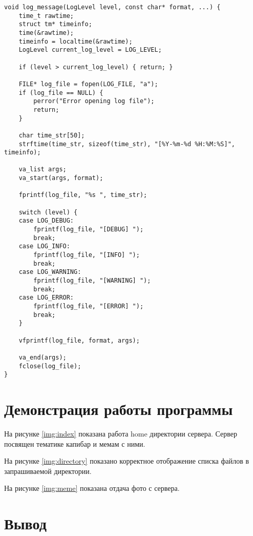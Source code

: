\documentclass{bmstu}
\begin{document}
\begin{lstlisting}[caption={Логгер}, label=lst:logger]
void log_message(LogLevel level, const char* format, ...) {
    time_t rawtime;
    struct tm* timeinfo;
    time(&rawtime);
    timeinfo = localtime(&rawtime);
    LogLevel current_log_level = LOG_LEVEL;

    if (level > current_log_level) { return; }

    FILE* log_file = fopen(LOG_FILE, "a");
    if (log_file == NULL) {
        perror("Error opening log file");
        return;
    }

    char time_str[50];
    strftime(time_str, sizeof(time_str), "[%Y-%m-%d %H:%M:%S]", timeinfo);

    va_list args;
    va_start(args, format);

    fprintf(log_file, "%s ", time_str);

    switch (level) {
    case LOG_DEBUG:
        fprintf(log_file, "[DEBUG] ");
        break;
    case LOG_INFO:
        fprintf(log_file, "[INFO] ");
        break;
    case LOG_WARNING:
        fprintf(log_file, "[WARNING] ");
        break;
    case LOG_ERROR:
        fprintf(log_file, "[ERROR] ");
        break;
    }

    vfprintf(log_file, format, args);

    va_end(args);
    fclose(log_file);
}
\end{lstlisting}

\section{Демонстрация работы программы}

На рисунке \ref{img:index} показана работа home директории сервера. Сервер посвящен тематике капибар и мемам с ними.

\clearpage

На рисунке \ref{img:directory} показано корректное отображение списка файлов в запрашиваемой директории.


На рисунке \ref{img:meme} показана отдача фото с сервера.


\section{Вывод}
\end{document}
